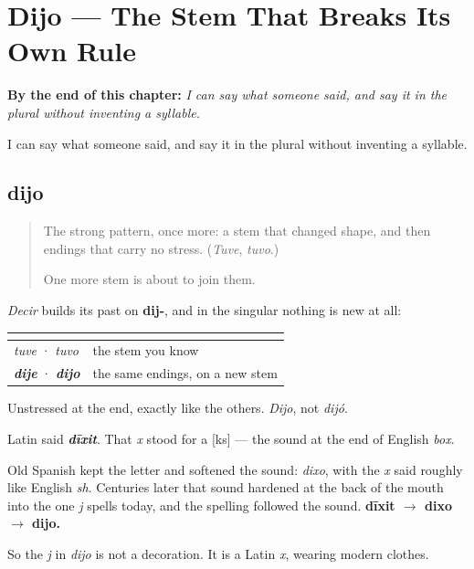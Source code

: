 
\chapter{Dijo --- The Stem That Breaks Its Own Rule}
\label{ch:dijo}

\begin{chapteropening}
\textbf{By the end of this chapter:} \emph{I can say what someone said, and say it in the plural without inventing a syllable.}

I can say what someone said, and say it in the plural without inventing a syllable.
\end{chapteropening}

\section[dijo]{dijo}

\label{lesson:ES-C57-dijo}



\begin{quote}
The strong pattern, once more: a stem that changed shape, and then endings that carry no stress. (\emph{Tuve}, \emph{tuvo}.)

One more stem is about to join them.
\end{quote}

\begin{grammarlens}[title={Grammar Lens: the stem is dij-}]
\emph{Decir} builds its past on \textbf{dij-}, and in the singular nothing is new at all:

\noindent
\begin{tabularx}{\linewidth}{@{}>{\raggedright\arraybackslash}X>{\raggedright\arraybackslash}X@{}}
\toprule
\textbf{} & \textbf{} \\
\midrule
\emph{tuve} · \emph{tuvo} & the stem you know \\
\emph{\textbf{dije}} · \emph{\textbf{dijo}} & the same endings, on a new stem \\
\bottomrule
\end{tabularx}

Unstressed at the end, exactly like the others. \emph{Dijo}, not \emph{dijó}.
\end{grammarlens}

\begin{cousinweb}
Latin said \emph{\textbf{dīxit}}. That \emph{x} stood for a {[}ks{]} — the sound at the end of English \emph{box}.

Old Spanish kept the letter and softened the sound: \emph{dixo}, with the \emph{x} said roughly like English \emph{sh}. Centuries later that sound hardened at the back of the mouth into the one \emph{j} spells today, and the spelling followed the sound. \textbf{dīxit $\to$ dixo $\to$ dijo.}

So the \emph{j} in \emph{dijo} is not a decoration. It is a Latin \emph{x}, wearing modern clothes.
\end{cousinweb}

